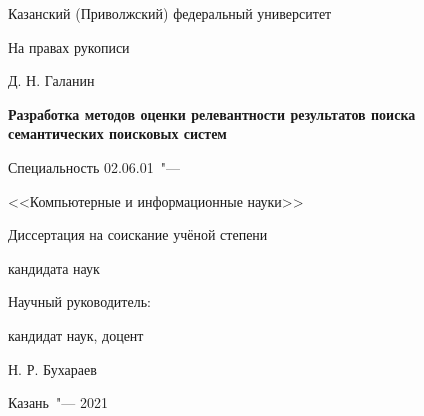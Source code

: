 \thispagestyle{empty}
\begin{center}
    Казанский (Приволжский) федеральный университет
\end{center}
%
\vspace{0pt plus4fill} %
\begin{flushright}
    На правах рукописи

\end{flushright}
%
\vspace{0pt plus6fill} %
\begin{center}
    {\large Д. Н. Галанин}
\end{center}
%
\vspace{0pt plus1fill} %
\begin{center}
    \textbf {\large %
        Разработка методов оценки релевантности результатов поиска семантических поисковых систем}

    \vspace{0pt plus2fill} %
    {%
        Специальность 02.06.01\ "---

        <<Компьютерные и информационные науки>>
    }

    \vspace{0pt plus2fill} %
    Диссертация на соискание учёной степени

    кандидата наук
\end{center}
%
\vspace{0pt plus4fill} %
\begin{flushright}

    Научный руководитель:

    кандидат наук, доцент

    Н. Р. Бухараев

\end{flushright}
%
\vspace{0pt plus4fill} %
{\centering Казань\ "--- 2021\par}
\newpage